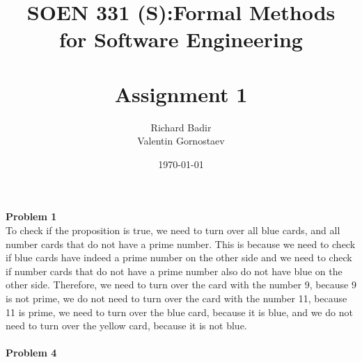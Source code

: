 \documentclass[12pt]{article}
\title{SOEN 331 (S):Formal Methods\\for Software Engineering\\
\ \\
Assignment 1}
\author{Richard Badir\\Valentin Gornostaev}
\date{\today}
\begin{document}
\maketitle



\newpage
\noindent \textbf{Problem 1}\\
\noindent To check if the proposition is true, we need to turn over all blue cards, and all number cards that do not have a prime number. This is because we need to check if blue cards have indeed a prime number on the other side and we need to check if number cards that do not have a prime number also do not have blue on the other side. Therefore, we need to turn over the card with the number 9, because 9 is not prime, we do not need to turn over the card with the number 11, because 11 is prime, we need to turn over the blue card, because it is blue, and we do not need to turn over the yellow card, because it is not blue.
\\
\\
\noindent \textbf{Problem 4}\\
\end{document}
